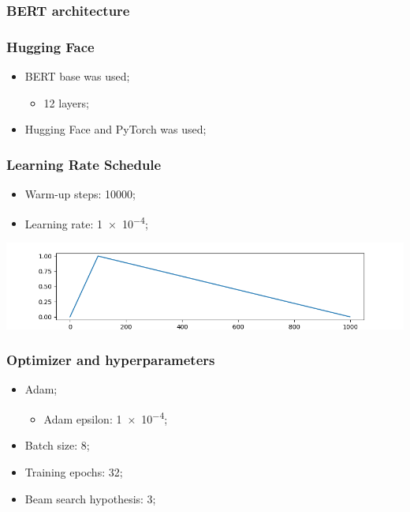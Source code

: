 \documentclass{beamer}
\begin{document}
\begin{frame}
  \frametitle{BERT architecture}
\end{frame}

\begin{frame}
  \frametitle{Hugging Face}

  \begin{itemize}
    \item BERT base was used;
          \begin{itemize}
            \item 12 layers;
          \end{itemize}
    \item Hugging Face and PyTorch was used;
  \end{itemize}
\end{frame}

\begin{frame}
  \frametitle{Learning Rate Schedule}

  \begin{itemize}
    \item Warm-up steps: \num{10000};
    \item Learning rate: \num{1e-4};
  \end{itemize}

  \bigbreak
  \bigbreak

  \includegraphics[width=\textwidth]{../latex-data/images/warmup_linear_schedule.png}
\end{frame}

\begin{frame}
  \frametitle{Optimizer and hyperparameters}

  \begin{itemize}
    \item Adam;
          \begin{itemize}
            \item Adam epsilon: \num{1e-4};
          \end{itemize}
    \item Batch size: \num{8};
    \item Training epochs: \num{32};
    \item Beam search hypothesis: \num{3};
  \end{itemize}
\end{frame}
\end{document}
